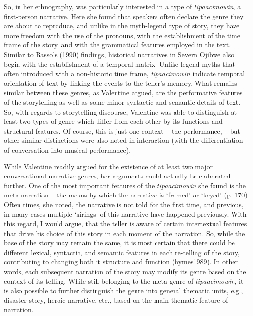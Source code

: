 \documentclass[12pt]{article}
\begin{document}
So, in her ethnography, \textcite{valentine1995} was particularly interested in a type of \textit{tipaacimowin}, a first-person narrative. Here she found that  speakers often declare the genre they are about to reproduce, and unlike in the myth-legend type of story, they have more freedom with the use of the pronouns, with the establishment of the time frame of the story, and with the grammatical features employed in the text. Similar to Basso's (1990) findings, historical narratives in Severn Ojibwe also begin with the establishment of a temporal matrix. Unlike legend-myths that often introduced with a non-historic time frame, \textit{tipaacimowin} indicate temporal orientation of text by linking the events to the teller's memory. What remains similar between these genres, as Valentine argued, are the performative features of the storytelling as well as some minor syntactic and semantic details of text. So, with regards to storytelling discourse, Valentine was able to distinguish at least two types of genre which differ from each other by its functions and structural features. Of course, this is just one context -- the performance, -- but other similar distinctions were also noted in interaction (with the differentiation of conversation into musical performance).

While Valentine readily argued for the existence of at least two major conversational narrative genres, her arguments could actually be elaborated further. One of the most important features of the \textit{tipaacimowin} she found is the meta-narration -- the means by which the narrative is `framed' or `keyed' (p. 170). Often times, she noted, the narrative is not told for the first time, and previous, in many cases multiple `airings' of this narrative have happened previously. With this regard, I would argue, that the teller is aware of certain intertextual features that drive his choice of this story in each moment of the narration. So, while the base of the story may remain the same, it is most certain that there could be different  lexical, syntactic, and semantic features in each re-telling of the story, contributing to changing both it structure and function (hymes1989). In other words, each subsequent narration of the story may modify its genre based on the context of its telling. While still belonging to the meta-genre of \textit{tipaacimowin}, it is also  possible to further distinguish the genre into general thematic units, e.g., disaster story, heroic narrative, etc., based on the main thematic feature of narration.
\end{document}
